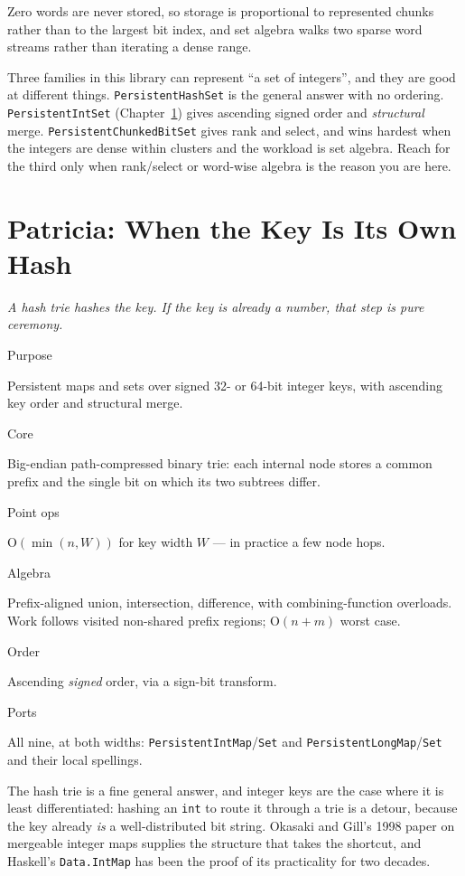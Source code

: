 \documentclass[11pt,twoside,openright]{book}
\newcommand{\code}[1]{\texorpdfstring{\textcolor{d7ink}{\texttt{#1}}}{#1}}
\newcommand{\bigoh}[1]{$\mathrm{O}(#1)$}
\newcommand{\motto}[1]{%
  \begingroup
  \vspace{-4pt}\hfill\begin{minipage}{0.80\textwidth}
    \raggedleft\itshape\color{d7slate}\small #1\par
  \end{minipage}\par\vspace{18pt}
  \endgroup}
\newcommand{\spec}[2]{%
  \par\noindent
  \parbox[t]{0.21\linewidth}{\raggedright\sffamily\bfseries\footnotesize
    \color{d7slate}\strut #1}%
  \hspace{9pt}%
  \parbox[t]{\dimexpr0.79\linewidth-9pt\relax}{\raggedright\strut #2}%
  \par\vspace{3.5pt}}
\newenvironment{specimen}[1][Specimen]
  {\begin{glancebox}[#1]\small\setlength{\parindent}{0pt}}
  {\end{glancebox}}
\begin{document}
Zero words are never stored, so storage is proportional to represented chunks
rather than to the largest bit index, and set algebra walks two sparse word
streams rather than iterating a dense range.

\begin{caveatbox}
Three families in this library can represent ``a set of integers'', and they are
good at different things. \code{PersistentHashSet} is the general answer with no
ordering. \code{PersistentIntSet} (Chapter~\ref{ch:patricia}) gives ascending
signed order and \emph{structural} merge. \code{PersistentChunkedBitSet} gives
rank and select, and wins hardest when the integers are dense within clusters
and the workload is set algebra. Reach for the third only when rank/select or
word-wise algebra is the reason you are here.
\end{caveatbox}

\chapter{Patricia: When the Key Is Its Own Hash}
\label{ch:patricia}

\motto{A hash trie hashes the key. If the key is already a number, that step is
pure ceremony.}

\begin{specimen}[Specimen --- Patricia integer maps and sets]
\spec{Purpose}{Persistent maps and sets over signed 32- or 64-bit integer keys, with ascending key order and structural merge.}
\spec{Core}{Big-endian path-compressed binary trie: each internal node stores a common prefix and the single bit on which its two subtrees differ.}
\spec{Point ops}{\bigoh{\min(n, W)} for key width $W$ --- in practice a few node hops.}
\spec{Algebra}{Prefix-aligned union, intersection, difference, with combining-function overloads. Work follows visited non-shared prefix regions; \bigoh{n+m} worst case.}
\spec{Order}{Ascending \emph{signed} order, via a sign-bit transform.}
\spec{Ports}{All nine, at both widths: \code{PersistentIntMap}/\code{Set} and \code{PersistentLongMap}/\code{Set} and their local spellings.}
\end{specimen}

\noindent
The hash trie is a fine general answer, and integer keys are the case where it
is least differentiated: hashing an \code{int} to route it through a trie is a
detour, because the key already \emph{is} a well-distributed bit string. Okasaki
and Gill's 1998 paper on mergeable integer maps supplies the structure that
takes the shortcut, and Haskell's \code{Data.IntMap} has been the proof of its
practicality for two decades.
\end{document}
